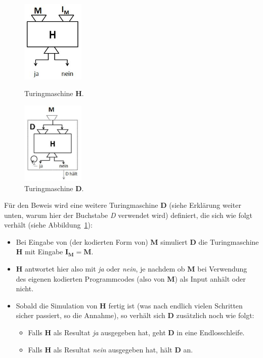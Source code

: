 \begin{figure}[h]
\begin{minipage}[h]{0.475\textwidth}
\centering
\includegraphics[width=3cm]{img/haltingproblem1.jpg}
    \caption{Turingmaschine $\mathbf{H}$.}
    \label{halteproblem_fig1}
\end{minipage}
%
\begin{minipage}[h]{0.475\textwidth}
\centering
\includegraphics[width=3cm]{img/haltingproblem2.jpg}
    \caption{Turingmaschine $\mathbf{D}$.}
    \label{halteproblem_fig2}
\end{minipage}
\end{figure}

Für den Beweis wird eine weitere Turingmaschine $\mathbf{D}$ (siehe Erklärung weiter unten, warum hier der Buchstabe \emph{D} verwendet wird) definiert, die sich wie folgt verhält (siehe Abbildung~\ref{halteproblem_fig2}):
\begin{itemize}
  \item Bei Eingabe von (der kodierten Form von) $\mathbf{M}$ simuliert $\mathbf{D}$  die Turingmaschine $\mathbf{H}$ mit Eingabe $\mathbf{I_M = M}$.
  \item $\mathbf{H}$ antwortet hier also mit \emph{ja} oder \emph{nein}, je nachdem ob $\mathbf{M}$ bei Verwendung des eigenen kodierten Programmcodes (also von $\mathbf{M}$) als Input anhält oder nicht.
  \item Sobald die Simulation von $\mathbf{H}$ fertig ist (was nach endlich vielen Schritten sicher passiert, so die Annahme), so verhält sich $\mathbf{D}$ zusätzlich noch wie folgt:
    \begin{itemize}
      \item Falls $\mathbf{H}$ als Resultat \emph{ja} ausgegeben hat, geht $\mathbf{D}$ in eine Endlosschleife.
      \item Falls $\mathbf{H}$ als Resultat \emph{nein} ausgegeben hat, hält $\mathbf{D}$  an.
    \end{itemize}
\end{itemize}

